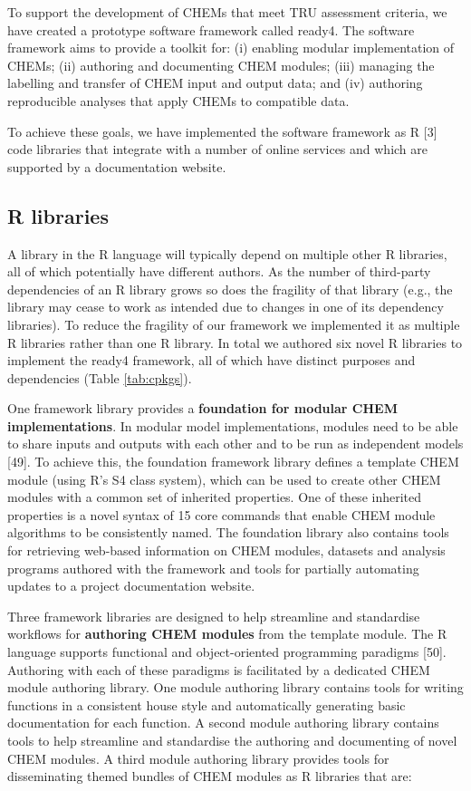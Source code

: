 \documentclass[
]{article}
\begin{document}
To support the development of CHEMs that meet TRU assessment criteria, we have created a prototype software framework called ready4. The software framework aims to provide a toolkit for: (i) enabling modular implementation of CHEMs; (ii) authoring and documenting CHEM modules; (iii) managing the labelling and transfer of CHEM input and output data; and (iv) authoring reproducible analyses that apply CHEMs to compatible data.

To achieve these goals, we have implemented the software framework as R {[}3{]} code libraries that integrate with a number of online services and which are supported by a documentation website.

\hypertarget{r-libraries}{%
\subsection{R libraries}\label{r-libraries}}

A library in the R language will typically depend on multiple other R libraries, all of which potentially have different authors. As the number of third-party dependencies of an R library grows so does the fragility of that library (e.g., the library may cease to work as intended due to changes in one of its dependency libraries). To reduce the fragility of our framework we implemented it as multiple R libraries rather than one R library. In total we authored six novel R libraries to implement the ready4 framework, all of which have distinct purposes and dependencies (Table \ref{tab:cpkgs}).

One framework library provides a \textbf{foundation for modular CHEM implementations}. In modular model implementations, modules need to be able to share inputs and outputs with each other and to be run as independent models {[}49{]}. To achieve this, the foundation framework library defines a template CHEM module (using R's S4 class system), which can be used to create other CHEM modules with a common set of inherited properties. One of these inherited properties is a novel syntax of 15 core commands that enable CHEM module algorithms to be consistently named. The foundation library also contains tools for retrieving web-based information on CHEM modules, datasets and analysis programs authored with the framework and tools for partially automating updates to a project documentation website.

Three framework libraries are designed to help streamline and standardise workflows for \textbf{authoring CHEM modules} from the template module. The R language supports functional and object-oriented programming paradigms {[}50{]}. Authoring with each of these paradigms is facilitated by a dedicated CHEM module authoring library. One module authoring library contains tools for writing functions in a consistent house style and automatically generating basic documentation for each function. A second module authoring library contains tools to help streamline and standardise the authoring and documenting of novel CHEM modules. A third module authoring library provides tools for disseminating themed bundles of CHEM modules as R libraries that are:
\end{document}
